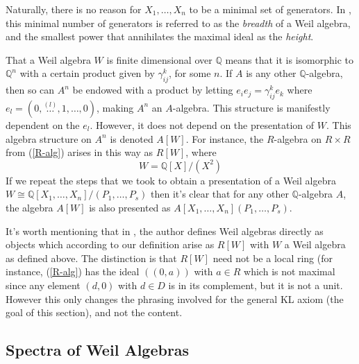 \documentclass[11pt]{article}
\theoremstyle{definition}
\newcommand{\Q}{\mathbb{Q}}
\numberwithin{equation}{section}
\begin{document}
Naturally, there is no reason for \( X_1,\dots,X_n \) to be a minimal set of generators. In \cite{lav96}, this minimal number of generators is referred to as the \emph{breadth} of a Weil algebra, and the smallest power that annihilates the maximal ideal as the \emph{height}.

That a Weil algebra \( W \) is finite dimensional over \( \Q \) means that it is isomorphic to \( \Q^n \) with a certain product given by \( \gamma_{ij}^k \), for some \( n \). If \( A \) is any other \( \Q \)-algebra, then so can \( A^n \) be endowed with a product by letting \( e_ie_j = \gamma_{ij}^ke_k \) where \( e_l = (0,\stackrel{(l)}{\dots},1,\dots,0) \), making \( A^n \) an \( A \)-algebra. This structure is manifestly dependent on the \( e_l \). However, it does not depend on the presentation of \( W \). This algebra structure on \( A^n \) is denoted \( A[W] \). For instance, the \( R \)-algebra on \( R\times R \) from (\ref{R-alg}) arises in this way as \( R[W] \), where
\begin{equation*}
  W = \Q[X]/(X^2)
\end{equation*}
If we repeat the steps that we took to obtain a presentation of a Weil algebra \( W \cong \mathbb{Q}[X_1,\dots,X_n]/(P_1,\dots,P_s) \) then it's clear that for any other \( \mathbb{Q} \)-algebra \( A \), the algebra \( A[W] \) is also presented as \( A[X_1,\dots,X_n](P_1,\dots,P_s) \).

It's worth mentioning that in \cite{lav96}, the author defines Weil algebras directly as objects which according to our definition arise as \( R[W] \) with \( W \) a Weil algebra as defined above. The distinction is that \( R[W] \) need not be a local ring (for instance, (\ref{R-alg}) has the ideal \( ((0,a)) \) with \( a\in R \) which is not maximal since any element \( (d,0) \) with \( d\in D \) is in its complement, but it is not a unit. However this only changes the phrasing involved for the general KL axiom (the goal of this section), and not the content.

\subsection{Spectra of Weil Algebras}
\end{document}
